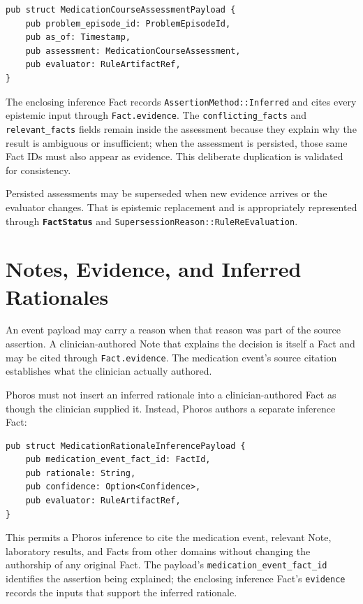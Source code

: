 \documentclass[11pt]{article}
\newcommand{\entity}[1]{\texttt{\textbf{#1}}}
\newcommand{\field}[1]{\texttt{#1}}
\begin{document}
\begin{lstlisting}
pub struct MedicationCourseAssessmentPayload {
    pub problem_episode_id: ProblemEpisodeId,
    pub as_of: Timestamp,
    pub assessment: MedicationCourseAssessment,
    pub evaluator: RuleArtifactRef,
}
\end{lstlisting}

The enclosing inference Fact records \field{AssertionMethod::Inferred} and
cites every epistemic input through \field{Fact.evidence}. The
\field{conflicting\_facts} and \field{relevant\_facts} fields remain inside the
assessment because they explain why the result is ambiguous or insufficient;
when the assessment is persisted, those same Fact IDs must also appear as
evidence. This deliberate duplication is validated for consistency.

Persisted assessments may be superseded when new evidence arrives or the
evaluator changes. That is epistemic replacement and is appropriately
represented through \entity{FactStatus} and
\field{SupersessionReason::RuleReEvaluation}.

\section{Notes, Evidence, and Inferred Rationales}
\label{sec:notes-and-rationales}

An event payload may carry a reason when that reason was part of the source
assertion. A clinician-authored Note that explains the decision is itself a
Fact and may be cited through \field{Fact.evidence}. The medication event's
source citation establishes what the clinician actually authored.

Phoros must not insert an inferred rationale into a clinician-authored Fact
as though the clinician supplied it. Instead, Phoros authors a separate
inference Fact:

\begin{lstlisting}
pub struct MedicationRationaleInferencePayload {
    pub medication_event_fact_id: FactId,
    pub rationale: String,
    pub confidence: Option<Confidence>,
    pub evaluator: RuleArtifactRef,
}
\end{lstlisting}

This permits a Phoros inference to cite the medication event, relevant Note,
laboratory results, and Facts from other domains without changing the
authorship of any original Fact. The payload's
\field{medication\_event\_fact\_id} identifies the assertion being explained;
the enclosing inference Fact's \field{evidence} records the inputs that support
the inferred rationale.
\end{document}
